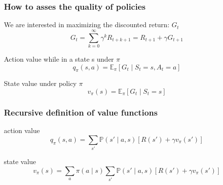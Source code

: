 \documentclass[dvipsnames,svgnames]{beamer}
\begin{document}
\begin{frame}
\frametitle{How to asses the quality of policies}
\begin{block}{We are interested in maximizing the discounted return: $G_t$}
$$ G_t= \sum_{k=0}^{\infty}\gamma^k R_{t+k+1} = R_{t+1} + \gamma G_{t+1}$$
\end{block}

\pause
\begin{block}{Action value while in a state s under $\pi$}
\begin{equation*}
q_{\pi}(s,a) = \mathbb{E}_{\pi}[G_t\mid S_t =s,A_t=a]
\end{equation*}
\end{block}

\pause
\begin{block}{State value under policy $\pi$}
\begin{equation*}
v_{\pi}(s)=\mathbb{E}_{\pi}[G_t \mid S_t=s]
\end{equation*}
\end{block}



\end{frame}

\begin{frame}
\frametitle{Recursive definition of value functions}
\begin{block}{action value}
\begin{equation*}
q_{\pi}(s,a) =  \sum_{s'}\mathbb{P}(s'\mid a,s)\left[R(s') + \gamma v_{\pi}(s') \right]
\end{equation*}
\end{block}

\begin{block}{state value}
\begin{equation*}
v_{\pi}(s) =\sum_{a }\pi(a \mid s) \sum_{s'}\mathbb{P}(s'\mid a,s)\left[R(s') + \gamma v_{\pi}(s') \right]
\end{equation*}
\end{block}
\end{frame}

%
\end{document}
